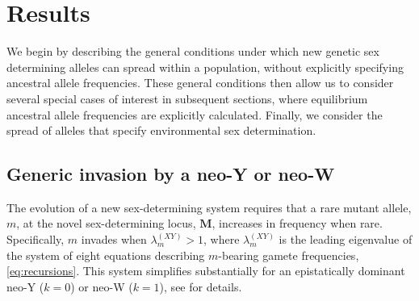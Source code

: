 \documentclass[10pt,letterpaper]{article}
\begin{document}
\section*{Results}

We begin by describing the general conditions under which new genetic sex determining alleles can spread within a population, without explicitly specifying ancestral allele frequencies.
These general conditions then allow us to consider several special cases of interest in subsequent sections, where equilibrium ancestral allele frequencies are explicitly calculated.
Finally, we consider the spread of alleles that specify environmental sex determination. 

\subsection*{Generic invasion by a neo-Y or neo-W}

The evolution of a new sex-determining system requires that a rare mutant allele, $m$, at the novel sex-determining locus, $\mathbf{M}$, increases in frequency when rare. 
Specifically, $m$ invades when $\lambda_m^{(XY)}>1$, where $\lambda_m^{(XY)}$ is the leading eigenvalue of the system of eight equations describing $m$-bearing gamete frequencies, \ref{eq:recursions}. 
This system simplifies substantially for an epistatically dominant neo-Y ($k=0$) or neo-W ($k=1$), see  for details. 
\end{document}
